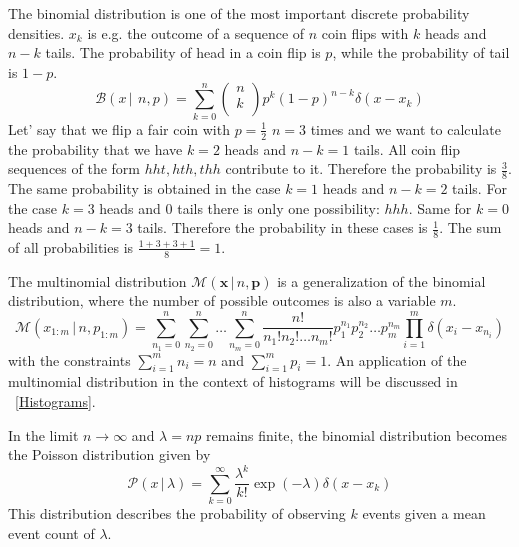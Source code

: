 \documentclass{tstextbook}
\begin{document}
\begin{example}
The binomial distribution is one of the most important discrete probability densities. $x_k$ is e.g. the outcome of a sequence of $n$ coin flips with $k$ heads and $n-k$ tails. The probability of head in a coin flip is $p$, while the probability of tail is $1-p$.  
  \begin{equation}
    \mathcal{B}(x\,\vert\,\ n,p)=\sum_{k=0}^n\left(\begin{array}{c}
n \\
k \\
\end{array}\right)p^k(1-p)^{n-k}\delta(x-x_k)
  \end{equation}
   Let' say that we flip a fair coin with $p=\frac{1}{2}$ $n=3$ times and we want to calculate the probability that we have $k=2$ heads and $n-k=1$ tails. All coin flip sequences of the form $hht,hth,thh$ contribute to it. Therefore the probability is $\frac{3}{8}$. The same probability is obtained in the case $k=1$ heads and $n-k=2$ tails. For the case $k=3$ heads and $0$ tails there is only one possibility: $hhh$. Same for $k=0$ heads and $n-k=3$ tails. Therefore the probability in these cases is $\frac{1}{8}$. The sum of all probabilities is $\frac{1+3+3+1}{8}=1$. 
\end{example}

\begin{example}
The multinomial distribution $ \mathcal{M}(\mathbf{x}\,\vert\, n,\mathbf{p})$ is a generalization of the binomial distribution, where the number of possible outcomes is also a variable $m$.  
  \begin{equation}
    \mathcal{M}(x_{1:m}\,\vert\, n,p_{1:m})=\sum_{n_1=0}^n\sum_{n_2=0}^n\ldots \sum_{n_m=0}^n \frac{n!}{n_1!n_2!\ldots n_m!}p_1^{n_1}p_2^{n_2}\ldots p_m^{n_m}\prod_{i=1}^m\delta(x_i-x_{n_i})
  \end{equation}
with the constraints $\sum_{i=1}^{m}n_i=n$ and $\sum_{i=1}^{m}p_i=1$. An application of the multinomial distribution in the context of histograms will be discussed in ~\ref{Histograms}. 
\end{example}

\begin{example}
In the limit $n\rightarrow\infty$ and $\lambda=np$ remains finite, the binomial distribution becomes the Poisson distribution given by
  \begin{equation}
    \mathcal{P}(x\,\vert\,\lambda)=\sum_{k=0}^{\infty}\frac{\lambda^k}{k!}\exp(-\lambda)\delta(x-x_k)
  \end{equation}
 This distribution describes the probability of observing $k$ events given a mean event count of $\lambda$.  
\end{example}
\end{document}
